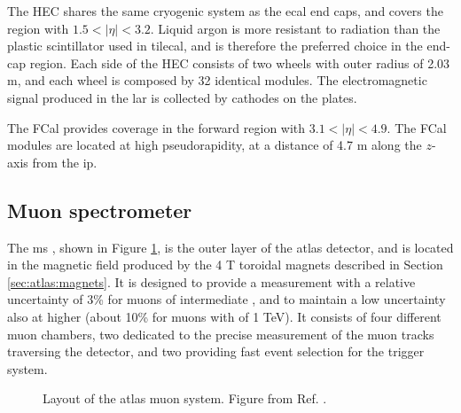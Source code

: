 The HEC shares the same cryogenic system as the \gls{ecal} end caps, and covers the region with $1.5<|\eta|<3.2$. Liquid argon is more resistant to radiation than the plastic scintillator used in \gls{tilecal}, and is therefore the preferred choice in the end-cap region. Each side of the HEC consists of two wheels with outer radius of 2.03 m, and each wheel is composed by 32 identical modules. The electromagnetic signal produced in the \gls{lar} is collected by cathodes on the plates. 

The FCal provides coverage in the forward region with $3.1<|\eta|<4.9$. The FCal modules are located at high pseudorapidity, at a distance of 4.7 m along the $z$-axis from the \gls{ip}.


\subsection{Muon spectrometer}

The \gls{ms} \cite{ATLAS:1997ad}, shown in Figure \ref{fig:atlas:muon}, is the outer layer of the \gls{atlas} detector, and is located in the magnetic field produced by the 4 T toroidal magnets described in Section \ref{sec:atlas:magnets}. It is designed to provide a \pt measurement with a relative uncertainty of 3\% for muons of intermediate \pt, and to maintain a low uncertainty also at higher \pt (about 10\% for muons with \pt of 1 TeV). It consists of four different muon chambers, two dedicated to the precise measurement of the muon tracks traversing the detector, 
and two providing fast event selection for the trigger system. 

\begin{figure}[ht]
\centering
{}
\caption{Layout of the \gls{atlas} muon system. Figure from Ref. \cite{atlas:atlas}.}
\label{fig:atlas:muon}
\end{figure}

